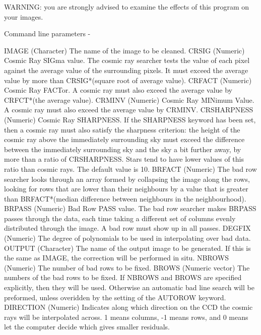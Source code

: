 \begin{description}
\begin{terminalv}
 WARNING: you are strongly advised to examine the effects of this
          program on your images.

 Command line parameters -

 IMAGE     (Character) The name of the image to be cleaned.
 CRSIG     (Numeric) Cosmic Ray SIGma value.  The cosmic ray
           searcher tests the value of each pixel against the
           average value of the surrounding pixels.  It must
           exceed the average value by more than CRSIG*(square
           root of average value).
 CRFACT    (Numeric) Cosmic Ray FACTor.  A cosmic ray must also
           exceed the average value by CRFCT*(the average value).
 CRMINV    (Numeric) Cosmic Ray MINimum Value.  A cosmic ray
           must also exceed the average value by CRMINV.
 CRSHARPNESS (Numeric) Cosmic Ray SHARPNESS. If the SHARPNESS
           keyword has been set, then a cosmic ray must also
           satisfy the sharpness criterion: the height of the cosmic
           ray above the immediately surrounding sky must exceed the
           difference between the immediately surrounding sky and the
           sky a bit further away, by more than a ratio of CRSHARPNESS.
           Stars tend to have lower values of this ratio than cosmic
           rays. The default value is 10.
 BRFACT    (Numeric) The bad row searcher looks through an array
           formed by collapsing the image along the rows, looking
           for rows that are lower than their neighbours by a
           value that is greater than BRFACT*(median difference
           between neighbours in the neighbourhood).
 BRPASS    (Numeric) Bad Row PASS value.  The bad row searcher
           makes BRPASS passes through the data, each time taking
           a different set of columns evenly distributed through
           the image.  A bad row must show up in all passes.
 DEGFIX    (Numeric) The degree of polynomials to be used in
           interpolating over bad data.
 OUTPUT    (Character) The name of the output image to be
           generated.  If this is the same as IMAGE, the
           correction will be performed in situ.
 NBROWS    (Numeric) The number of bad rows to be fixed.
 BROWS     (Numeric vector) The numbers of the bad rows to
           be fixed.  If NBROWS and BROWS are specified
           explicitly, then they will be used.  Otherwise
           an automatic bad line search will be preformed,
           unless overidden by the setting of the AUTOROW
           keyword.
 DIRECTION (Numeric) Indicates along which direction on the CCD
           the cosmic rays will be interpolated across. 1 means
           columns, -1 means rows, and 0 means let the computer
           decide which gives smaller residuals.


\end{terminalv}
\end{description}
